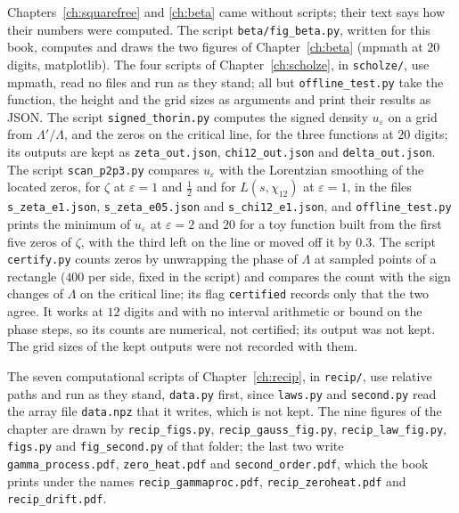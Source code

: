 Chapters~\ref{ch:squarefree} and \ref{ch:beta} came without scripts; their text says how their numbers were computed. The script \texttt{beta/fig\_beta.py}, written for this book, computes and draws the two figures of Chapter~\ref{ch:beta} (mpmath at $20$ digits, matplotlib). The four scripts of Chapter~\ref{ch:scholze}, in \texttt{scholze/}, use mpmath, read no files and run as they stand; all but \texttt{offline\_test.py} take the function, the height and the grid sizes as arguments and print their results as JSON. The script \texttt{signed\_thorin.py} computes the signed density $u_\varepsilon$ on a grid from $\Lambda'/\Lambda$, and the zeros on the critical line, for the three functions at $20$ digits; its outputs are kept as \texttt{zeta\_out.json}, \texttt{chi12\_out.json} and \texttt{delta\_out.json}. The script \texttt{scan\_p2p3.py} compares $u_\varepsilon$ with the Lorentzian smoothing of the located zeros, for $\zeta$ at $\varepsilon=1$ and $\frac12$ and for $L(s,\chi_{12})$ at $\varepsilon=1$, in the files \texttt{s\_zeta\_e1.json}, \texttt{s\_zeta\_e05.json} and \texttt{s\_chi12\_e1.json}, and \texttt{offline\_test.py} prints the minimum of $u_\varepsilon$ at $\varepsilon=2$ and $20$ for a toy function built from the first five zeros of $\zeta$, with the third left on the line or moved off it by $0.3$. The script \texttt{certify.py} counts zeros by unwrapping the phase of $\Lambda$ at sampled points of a rectangle ($400$ per side, fixed in the script) and compares the count with the sign changes of $\Lambda$ on the critical line; its flag \texttt{certified} records only that the two agree. It works at $12$ digits and with no interval arithmetic or bound on the phase steps, so its counts are numerical, not certified; its output was not kept. The grid sizes of the kept outputs were not recorded with them.

The seven computational scripts of Chapter~\ref{ch:recip}, in \texttt{recip/}, use relative paths and run as they stand, \texttt{data.py} first, since \texttt{laws.py} and \texttt{second.py} read the array file \texttt{data.npz} that it writes, which is not kept. The nine figures of the chapter are drawn by \texttt{recip\_figs.py}, \texttt{recip\_gauss\_fig.py}, \texttt{recip\_law\_fig.py}, \texttt{figs.py} and \texttt{fig\_second.py} of that folder; the last two write \texttt{gamma\_process.pdf}, \texttt{zero\_heat.pdf} and \texttt{second\_order.pdf}, which the book prints under the names \texttt{recip\_gammaproc.pdf}, \texttt{recip\_zeroheat.pdf} and \texttt{recip\_drift.pdf}.

